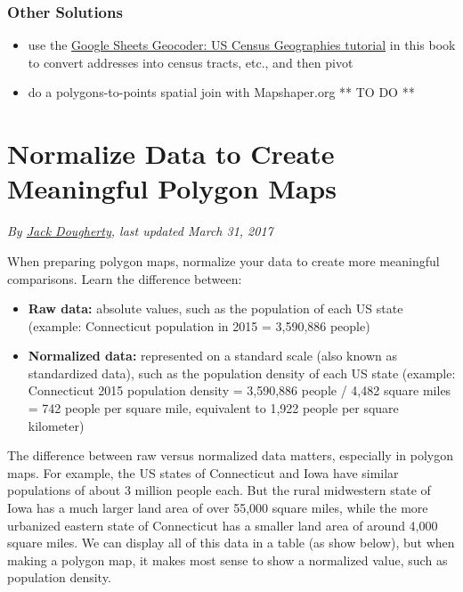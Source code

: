 \documentclass[
  english,
]{book}
\providecommand{\tightlist}{%
  \setlength{\itemsep}{0pt}\setlength{\parskip}{0pt}}
\begin{document}
\hypertarget{other-solutions}{%
\subsubsection*{Other Solutions}\label{other-solutions}}

\begin{itemize}
\tightlist
\item
  use the \href{geocode}{Google Sheets Geocoder: US Census Geographies tutorial} in this book to convert addresses into census tracts, etc., and then pivot
\item
  do a polygons-to-points spatial join with Mapshaper.org ** TO DO **
\end{itemize}

\hypertarget{normalize}{%
\section{Normalize Data to Create Meaningful Polygon Maps}\label{normalize}}

\emph{By \href{authors}{Jack Dougherty}, last updated March 31, 2017}

When preparing polygon maps, normalize your data to create more meaningful comparisons. Learn the difference between:

\begin{itemize}
\tightlist
\item
  \textbf{Raw data:} absolute values, such as the population of each US state (example: Connecticut population in 2015 = 3,590,886 people)
\item
  \textbf{Normalized data:} represented on a standard scale (also known as standardized data), such as the population density of each US state (example: Connecticut 2015 population density = 3,590,886 people / 4,482 square miles = 742 people per square mile, equivalent to 1,922 people per square kilometer)
\end{itemize}

The difference between raw versus normalized data matters, especially in polygon maps. For example, the US states of Connecticut and Iowa have similar populations of about 3 million people each. But the rural midwestern state of Iowa has a much larger land area of over 55,000 square miles, while the more urbanized eastern state of Connecticut has a smaller land area of around 4,000 square miles. We can display all of this data in a table (as show below), but when making a polygon map, it makes most sense to show a normalized value, such as population density.
\end{document}
